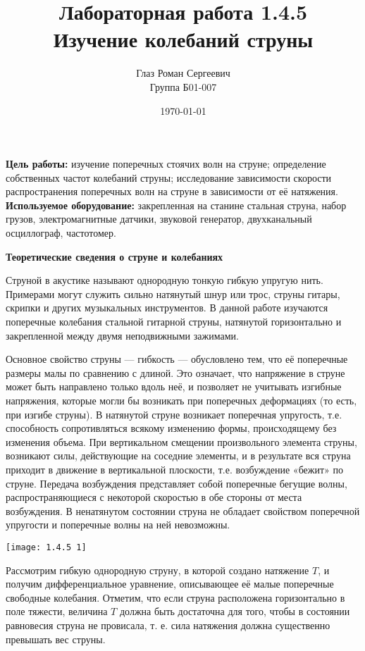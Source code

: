 \documentclass[a4paper,12pt]{article} %
\author{Глаз Роман Сергеевич\\ Группа Б01-007}
\title{Лабораторная работа 1.4.5\\ Изучение колебаний струны}
\date{\today}
\begin{document}
 
\maketitle

\textbf{Цель работы:}  изучение поперечных стоячих волн на струне; определение собственных частот колебаний струны; исследование зависимости скорости распространения
поперечных волн на струне в зависимости от её натяжения.\\

\textbf{Используемое оборудование:} закрепленная на станине стальная струна, набор грузов,
электромагнитные датчики, звуковой генератор, двухканальный осциллограф, частотомер.

\begin{center}
 \textbf{Теоретические сведения о струне и колебаниях}
\end{center}

Струной в акустике называют однородную тонкую гибкую упругую нить. Примерами могут служить сильно натянутый шнур или трос, струны гитары, скрипки и других музыкальных инструментов. В данной работе изучаются поперечные колебания стальной гитарной струны, натянутой горизонтально и закрепленной между двумя неподвижными зажимами.

Основное свойство струны — гибкость — обусловлено тем, что её поперечные размеры малы по сравнению с длиной. Это означает, что напряжение
в струне может быть направлено только вдоль неё, и позволяет не учитывать
изгибные напряжения, которые могли бы возникать при поперечных деформациях (то есть, при изгибе струны).
В натянутой струне возникает поперечная упругость, т.е. способность сопротивляться всякому изменению формы, происходящему без изменения
объема. При вертикальном смещении произвольного элемента струны, возникают силы, действующие на соседние элементы, и в результате вся струна
приходит в движение в вертикальной плоскости, т.е. возбуждение «бежит» по
струне. Передача возбуждения представляет собой поперечные бегущие
волны, распространяющиеся с некоторой скоростью в обе стороны от места
возбуждения. В ненатянутом состоянии струна не обладает свойством поперечной упругости и поперечные волны на ней невозможны.

\texttt{[image: 1.4.5 1]}

Рассмотрим гибкую однородную струну, в которой создано натяжение $T$,
и получим дифференциальное уравнение, описывающее её малые поперечные свободные колебания. Отметим, что если струна расположена горизонтально в поле тяжести, величина $T$ должна быть достаточна для того, чтобы в
состоянии равновесия струна не провисала, т. е. сила натяжения должна существенно превышать вес струны.
\end{document}
